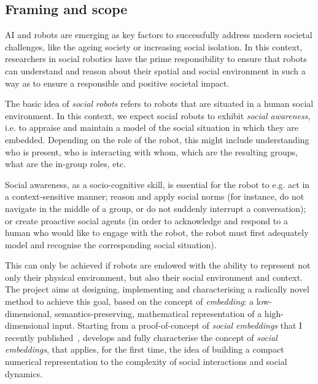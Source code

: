 %
%

\subsection{Framing and scope}

AI and robots are emerging as key factors to successfully address modern societal
challenges, like the ageing society or increasing social isolation. In this
context, researchers in social robotics have the prime responsibility to ensure
that robots can understand and reason about their spatial and social environment
in such a way as to ensure a responsible and positive societal impact.

The basic idea of \emph{social robots} refers to robots that are situated in a
human social environment. In this context, we expect social robots to exhibit
\emph{social awareness}, i.e. to appraise and maintain a model of the social
situation in which they are embedded. Depending on the role of the robot, this
might include understanding who is present, who is interacting with whom, which
are the resulting groups,  what are the in-group roles,  etc.

Social awareness, as a socio-cognitive skill, is essential for the robot to e.g.
act in a context-sensitive manner; reason and apply social norms (for instance,
do not navigate in the middle of a group, or do not suddenly interrupt a
conversation); or create proactive social agents (in order to acknowledge and
respond to a human who would like to engage with the robot, the robot must first
adequately model and recognise the corresponding social situation).

This can only be achieved if robots are endowed with the ability to represent
not only their physical environment, but also their social environment and
context. The \project project aims at designing, implementing and characterising
a radically novel method to achieve this goal, based on the concept of
\emph{embedding}: a low-dimensional, semantics-preserving, mathematical
representation of a high-dimensional input. Starting from a proof-of-concept of
\emph{social embeddings} that I recently published~\cite{lemaignan2024social},
\project develops and fully characterise the concept of \emph{social
embeddings}, that applies, for the first time, the idea of building a compact
numerical representation to the complexity of social interactions and social
dynamics.

